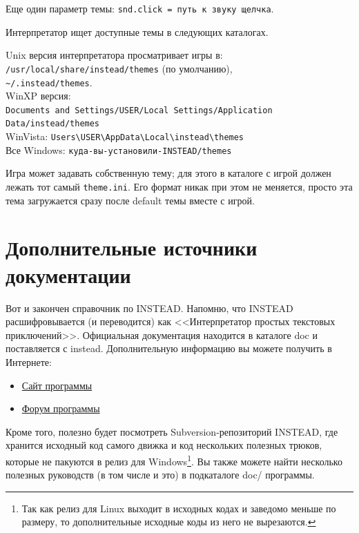 \documentclass[a4paper,12pt]{article}
\begin{document}
Еще один параметр темы: \verb/snd.click = путь к звуку щелчка/.

Интерпретатор ищет доступные темы в следующих каталогах.

Unix версия интерпретатора просматривает игры в:\\
\verb;/usr/local/share/instead/themes; (по умолчанию),\\
\verb,~/.instead/themes,.\\
WinXP версия:\\
\verb;Documents and Settings/USER/Local Settings/Application Data/instead/themes;\\
WinVista: \verb;Users\USER\AppData\Local\instead\themes;\\
Все Windows: \verb;куда-вы-установили-INSTEAD/themes;

Игра может задавать собственную тему; для этого в каталоге с игрой должен лежать тот самый \verb/theme.ini/. Его формат никак при этом не меняется, просто эта тема загружается сразу после default темы вместе с игрой.

\section{Дополнительные источники документации}
Вот и закончен справочник по INSTEAD. Напомню, что INSTEAD расшифровывается (и переводится) как <<Интерпретатор простых текстовых приключений>>. Официальная документация находится в каталоге doc и поставляется с instead. Дополнительную информацию вы можете получить в Интернете:

\begin{itemize}
\item \href{http://instead.googlecode.com/}{Сайт программы}
\item \href{http://instead.pinebrush.com/}{Форум программы}
\end{itemize}

Кроме того, полезно будет посмотреть Subversion-репозиторий INSTEAD, где хранится исходный код самого движка и код нескольких полезных трюков, которые не пакуются в релиз для Windows\footnote{Так как релиз для Linux выходит в исходных кодах и заведомо меньше по размеру, то дополнительные исходные коды из него не вырезаются.}. Вы также можете найти несколько полезных руководств (в том числе и это) в подкаталоге doc/ программы.

\printindex
\end{document}
